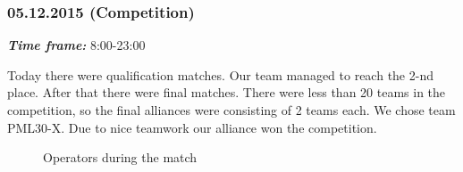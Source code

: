 \subsubsection{05.12.2015 (Competition)}
\textit{\textbf{Time frame:}} 8:00-23:00 

Today there were qualification matches. Our team managed to reach the 2-nd place. \newline
After that there were final matches. There were less than 20 teams in the competition, so the final alliances were consisting of 2 teams each. We chose team PML30-X. Due to nice teamwork our alliance won the competition.

\begin{figure}[H]
	\begin{minipage}[h]{0.47\linewidth}
		\caption{Operators during the match}
	\end{minipage}
	\hfill
	\begin{minipage}[h]{0.47\linewidth}

\end{minipage}
\end{figure}

